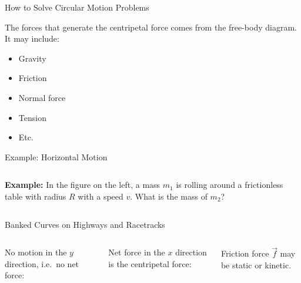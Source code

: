 \documentclass[12pt,compress,aspectratio=169]{beamer}
\begin{document}
\begin{frame}{How to Solve Circular Motion Problems}
%
  
  The forces that generate the centripetal force comes from the free-body
  diagram. It may include:
  \begin{itemize}
  \item Gravity
  \item Friction
  \item Normal force
  \item Tension
  \item Etc.
  \end{itemize}
\end{frame}



\begin{frame}{Example: Horizontal Motion}
  \begin{columns}
    
    \textbf{Example:} In the figure on the left, a mass $m_1$ is rolling around
    a frictionless table with radius $R$ with a speed $v$. What is the mass of
    $m_2$?
  \end{columns}
\end{frame}


\begin{frame}{Banked Curves on Highways and Racetracks}
  \begin{columns}
    \centering
    

    No motion in the $y$ direction, i.e.\ no net force:


    Net force in the $x$ direction is the centripetal force:


    Friction force $\vec f$ may be static or kinetic.
  \end{columns}
\end{frame}
\end{document}

